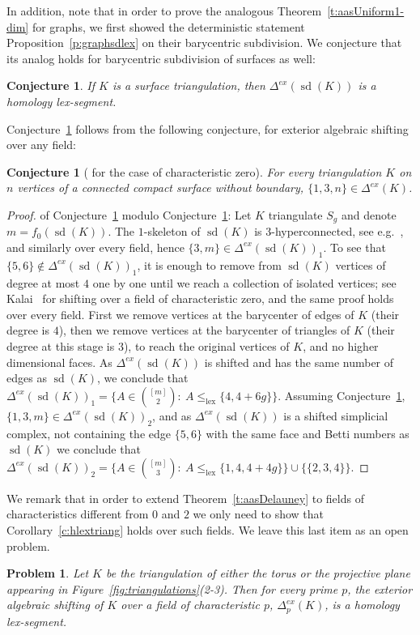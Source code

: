 \documentclass[reqno,english]{amsart}
\newtheorem{problem}[theorem]{Problem}
\newtheorem{conjecture}[theorem]{Conjecture}
\numberwithin{claimcounter}{theorem}
\theoremstyle{remark}
\theoremstyle{definition}
\numberwithin{theorem}{section}
\DeclareMathOperator{\lex}{lex}
\DeclareMathOperator{\sd}{sd}
\newcommand{\exshift}[1]{\Delta^{ex}(#1)}
\begin{document}
In addition, note that in order to prove the analogous Theorem~\ref{t:aasUniform1-dim} for graphs, we first showed the deterministic statement Proposition~\ref{p:graphsdlex} on their barycentric subdivision. We conjecture that its analog holds for barycentric subdivision of surfaces as well:   
\begin{conjecture}\label{conj:br(surface)}
    If $K$ is a surface triangulation, then $\exshift{\sd(K)}$ is a homology lex-segment.
\end{conjecture}
Conjecture~\ref{conj:br(surface)} follows from the following conjecture, for exterior algebraic shifting over any field:
\begin{conjecture}
[{\cite[Conj.5.1]{bulavka23-rigidity}} for the case of characteristic zero]
\label{conj:area-rig}
For every triangulation $K$ on $n$ vertices of a connected compact surface without boundary, 
$\{1,3,n\} \in \exshift{K}$. 
\end{conjecture}
\begin{proof} of Conjecture~\ref{conj:br(surface)} modulo 
Conjecture~\ref{conj:area-rig}: 
Let $K$ triangulate $S_g$ and denote $m=f_0(\sd(K))$.
The $1$-skeleton of $\sd(K)$ is $3$-hyperconnected, see e.g.~\cite[Thm.3.4.2]{nevo07-thesis}, and similarly over every field, hence $\{3,m\}\in \exshift{\sd(K)}_1$. To see that $\{5,6\}\notin \exshift{\sd(K)}_1$, it is enough to remove from $\sd(K)$ vertices of degree at most $4$ one by one until we reach a collection of isolated vertices; see Kalai~\cite[Lem.4.3(i)]{kalai85-hyperconnectivity} for shifting over a field of characteristic zero, and the same proof holds over every field. First we remove vertices at the barycenter of edges of $K$ (their degree is $4$), then we remove vertices at the barycenter of triangles of $K$ (their degree at this stage is $3$), to reach the original vertices of $K$, and no higher dimensional faces. As 
$\exshift{\sd(K)}$ is shifted and has the same number of edges as $\sd(K)$, we conclude that $\exshift{\sd(K)}_1=\{A\in \binom{[m]}{2}:\ A\le_{\lex} \{4,4+6g\} \}$.
Assuming Conjecture~\ref{conj:area-rig}, $\{1,3,m\}\in \exshift{\sd(K)}_2$, and as $\exshift{\sd(K)}$ is a shifted simplicial complex, not containing the edge $\{5,6\}$ with the same face and Betti numbers as $\sd(K)$ we conclude that $\exshift{\sd(K)}_2=\{A\in \binom{[m]}{3}:\ A\le_{\lex} \{1,4,4+4g\}\}\cup\{\{2,3,4\}\}$.
\end{proof}

We remark that in order to extend Theorem~\ref{t:aasDelauney} to fields of characteristics different from $0$ and $2$ we only need to show that Corollary~\ref{c:hlextriang} holds over such fields. We leave this last item as an open problem.
\begin{problem}
    Let $K$ be the triangulation of either the torus or the projective plane appearing in Figure~\ref{fig:triangulations}(2-3). Then for every prime $p$, the exterior algebraic shifting of $K$ over a field of characteristic $p$, $\Delta^{ex}_p(K)$, is a homology lex-segment.
\end{problem}
\end{document}

